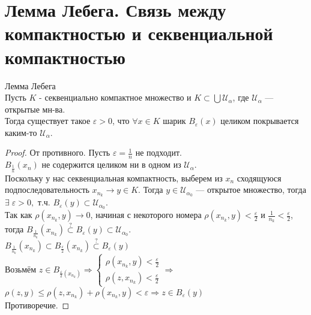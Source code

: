 \section{Лемма Лебега. Связь между компактностью и секвенциальной компактностью \href{https://youtu.be/IwHCWoW4oes?t=4113}{\Walley}} 

\begin{lemma}
    Лемма Лебега \\
    
    Пусть $K$ - секвенциально компактное множество
    и $K \subset \bigcup \mathcal{U_{\alpha}}$, где $\mathcal{U_{\alpha}}$ --- открытые мн-ва. \\
    Тогда существует такое $\varepsilon > 0$, что $\forall x \in K$ шарик $B_{\varepsilon}(x)$ целиком покрывается каким-то $\mathcal{U_{\alpha}}$.
    \begin{proof}
        От противного. Пусть $\varepsilon = \frac{1}{n}$ не подходит. \\
         $B_{\frac{1}{n}}(x_n)$ не содержится целиком ни в одном из $\mathcal{U_{\alpha}}$.  \\
         Поскольку у нас секвенциальная компактность, выберем из $x_n$ сходящуюся подпоследовательность $x_{n_k} \rightarrow y \in K$.
         Тогда $y \in \mathcal{U}_{{\alpha}_0}$ --- открытое множество, тогда $\exists \; \varepsilon > 0,$ т.ч. $B_{\varepsilon}(y) \subset \mathcal{U}_{{\alpha}_0}$. \\
         Так как $\rho(x_{n_k},y)\rightarrow 0$, начиная с некоторого номера $\rho(x_{n_k},y) < \frac{\varepsilon}{2}$ и $\frac{1}{n_k} < \frac{\varepsilon}{2}$, \\
         тогда $B_{\frac{1}{n_k}}(x_{n_k}) \stackrel{?}{\subset} B_{\varepsilon}(y) \subset \mathcal{U}_{{\alpha}_0}$. \\
         $B_{\frac{1}{n_k}}(x_{n_k}) \subset B_{\frac{\varepsilon}{2}}(x_{n_k}) \stackrel{?}{\subset} B_{\varepsilon}(y)$ \\
         Возьмём $z \in B_{\frac{\varepsilon}{2}(x_{n_k})} \Longrightarrow 
         \begin{cases}
             \rho(x_{n_k},y) < \frac{\varepsilon}{2} \\
             \rho(z,x_{n_k}) < \frac{\varepsilon}{2}
         \end{cases} \Longrightarrow$ 
        $\rho(z,y) \leqslant \rho (z, x_{n_k}) + \rho (x_{n_k},y) < \varepsilon \Longrightarrow z \in B_{\varepsilon}(y)$ \\
        Противоречие.
    \end{proof}

\end{lemma}

